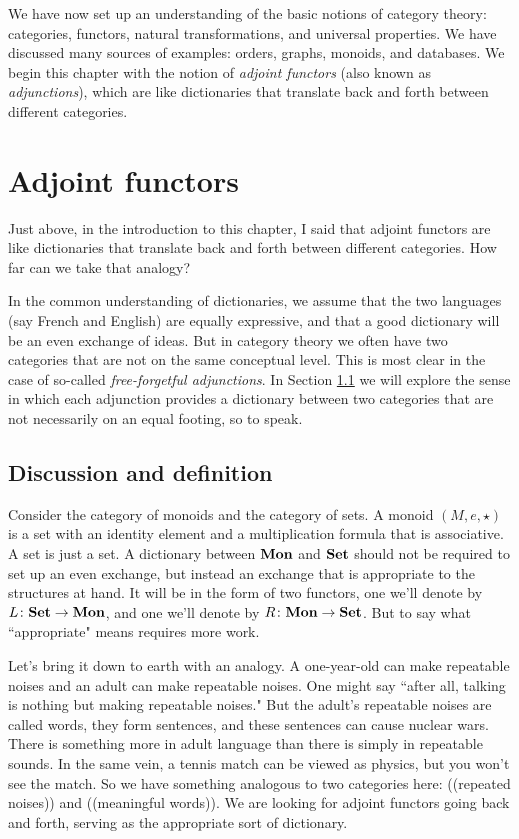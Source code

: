 \documentclass{book}
\def\to{\rightarrow}
\def\taking{\colon}
\def\Mon{{\bf Mon}}
\def\Set{{\bf Set}}
\theoremstyle{remark}
\theoremstyle{definition}
\begin{document}
We have now set up an understanding of the basic notions of category theory: categories, functors, natural transformations, and universal properties. We have discussed many sources of examples: orders, graphs, monoids, and databases. We begin this chapter with the notion of {\em adjoint functors} (also known as {\em adjunctions}), which are like dictionaries that translate back and forth between different categories. 


\section{Adjoint functors}

Just above, in the introduction to this chapter, I said that adjoint functors are like dictionaries that translate back and forth between different categories. How far can we take that analogy?

In the common understanding of dictionaries, we assume that the two languages (say French and English) are equally expressive, and that a good dictionary will be an even exchange of ideas. But in category theory we often have two categories that are not on the same conceptual level. This is most clear in the case of so-called {\em free-forgetful adjunctions}. In Section \ref{sec:adjoints discuss and define} we will explore the sense in which each adjunction provides a dictionary between two categories that are not necessarily on an equal footing, so to speak.


\subsection{Discussion and definition}\label{sec:adjoints discuss and define}

Consider the category of monoids and the category of sets. A monoid $(M,e,\star)$ is a set with an identity element and a multiplication formula that is associative. A set is just a set. A dictionary between $\Mon$ and $\Set$ should not be required to set up an even exchange, but instead an exchange that is appropriate to the structures at hand. It will be in the form of two functors, one we'll denote by $L\taking\Set\to\Mon$, and one we'll denote by $R\taking\Mon\to\Set$. But to say what ``appropriate" means requires more work.\index{a functor!$\Set\to\Mon$}\index{a functor!$\Mon\to\Set$}

Let's bring it down to earth with an analogy. A one-year-old can make repeatable noises and an adult can make repeatable noises. One might say ``after all, talking is nothing but making repeatable noises." But the adult's repeatable noises are called words, they form sentences, and these sentences can cause nuclear wars. There is something more in adult language than there is simply in repeatable sounds. In the same vein, a tennis match can be viewed as physics, but you won't see the match. So we have something analogous to two categories here: ((repeated noises)) and ((meaningful words)). We are looking for adjoint functors going back and forth, serving as the appropriate sort of dictionary.
\end{document}
